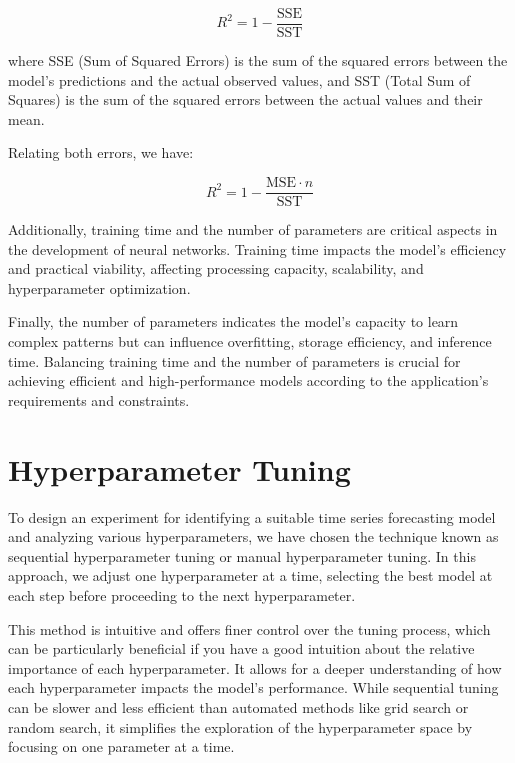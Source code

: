 \begin{equation}
R^2 = 1 - \frac{\text{SSE}}{\text{SST}}
\end{equation}

where SSE (Sum of Squared Errors) is the sum of the squared errors between the model's predictions and the actual observed values, and SST (Total Sum of Squares) is the sum of the squared errors between the actual values and their mean.

Relating both errors, we have:

\begin{equation}
R^2 = 1 - \frac{\text{MSE} \cdot n}{\text{SST}}
\end{equation}

Additionally, training time and the number of parameters are critical aspects in the development of neural networks. Training time impacts the model's efficiency and practical viability, affecting processing capacity, scalability, and hyperparameter optimization.

Finally, the number of parameters indicates the model's capacity to learn complex patterns but can influence overfitting, storage efficiency, and inference time. Balancing training time and the number of parameters is crucial for achieving efficient and high-performance models according to the application’s requirements and constraints.

\section{Hyperparameter Tuning}

To design an experiment for identifying a suitable time series forecasting model and analyzing various hyperparameters, we have chosen the technique known as sequential hyperparameter tuning or manual hyperparameter tuning. In this approach, we adjust one hyperparameter at a time, selecting the best model at each step before proceeding to the next hyperparameter.

This method is intuitive and offers finer control over the tuning process, which can be particularly beneficial if you have a good intuition about the relative importance of each hyperparameter. It allows for a deeper understanding of how each hyperparameter impacts the model's performance. While sequential tuning can be slower and less efficient than automated methods like grid search or random search, it simplifies the exploration of the hyperparameter space by focusing on one parameter at a time.

